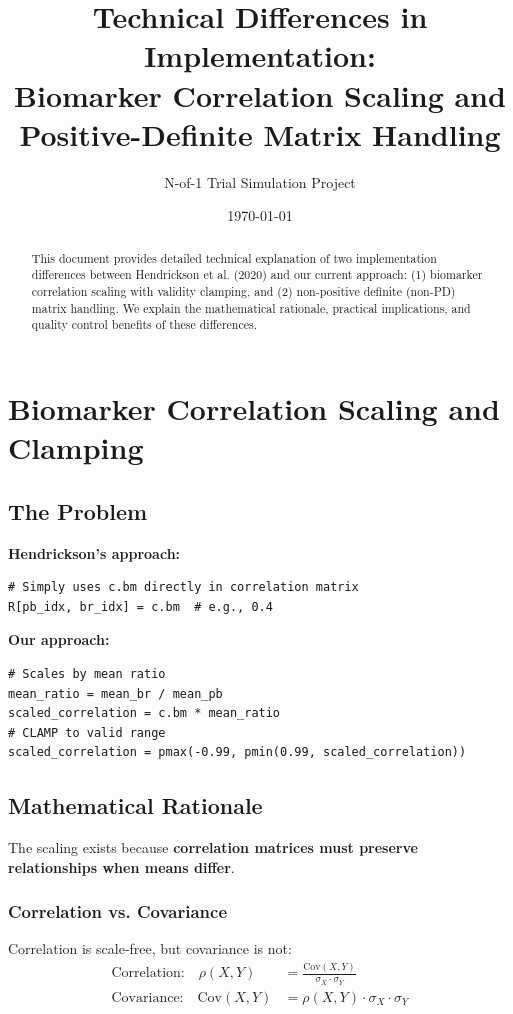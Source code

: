 \documentclass[11pt]{article}
\title{Technical Differences in Implementation:\\
Biomarker Correlation Scaling and\\
Positive-Definite Matrix Handling}
\author{N-of-1 Trial Simulation Project}
\date{\today}
\begin{document}
\maketitle

\begin{abstract}
This document provides detailed technical explanation of two implementation differences between Hendrickson et al. (2020) and our current approach: (1) biomarker correlation scaling with validity clamping, and (2) non-positive definite (non-PD) matrix handling. We explain the mathematical rationale, practical implications, and quality control benefits of these differences.
\end{abstract}

\tableofcontents
\newpage

\section{Biomarker Correlation Scaling and Clamping}

\subsection{The Problem}

\textbf{Hendrickson's approach:}
\begin{lstlisting}[style=Rstyle]
# Simply uses c.bm directly in correlation matrix
R[pb_idx, br_idx] = c.bm  # e.g., 0.4
\end{lstlisting}

\textbf{Our approach:}
\begin{lstlisting}[style=Rstyle]
# Scales by mean ratio
mean_ratio = mean_br / mean_pb
scaled_correlation = c.bm * mean_ratio
# CLAMP to valid range
scaled_correlation = pmax(-0.99, pmin(0.99, scaled_correlation))
\end{lstlisting}

\subsection{Mathematical Rationale}

The scaling exists because \textbf{correlation matrices must preserve relationships when means differ}.

\subsubsection{Correlation vs. Covariance}

Correlation is scale-free, but covariance is not:
\begin{align}
\text{Correlation:} \quad \rho(X,Y) &= \frac{\text{Cov}(X,Y)}{\sigma_X \cdot \sigma_Y} \\
\text{Covariance:} \quad \text{Cov}(X,Y) &= \rho(X,Y) \cdot \sigma_X \cdot \sigma_Y
\end{align}
\end{document}
